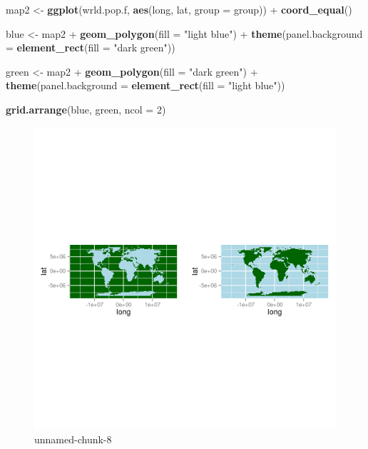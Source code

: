\documentclass[]{article}
\makeatletter
\newenvironment{Shaded}{}{}
\newcommand{\KeywordTok}[1]{\textcolor[rgb]{0.00,0.44,0.13}{\textbf{{#1}}}}
\newcommand{\DataTypeTok}[1]{\textcolor[rgb]{0.56,0.13,0.00}{{#1}}}
\newcommand{\DecValTok}[1]{\textcolor[rgb]{0.25,0.63,0.44}{{#1}}}
\newcommand{\StringTok}[1]{\textcolor[rgb]{0.25,0.44,0.63}{{#1}}}
\newcommand{\NormalTok}[1]{{#1}}
\def\maxwidth{\ifdim\Gin@nat@width>\linewidth\linewidth
\else\Gin@nat@width\fi}
\let\Oldincludegraphics\includegraphics
\renewcommand{\includegraphics}[1]{\Oldincludegraphics[width=\maxwidth]{#1}}
\makeatother
\begin{document}
\begin{Shaded}
\begin{Highlighting}[]
\NormalTok{map2 <-}\StringTok{ }\KeywordTok{ggplot}\NormalTok{(wrld.pop.f, }\KeywordTok{aes}\NormalTok{(long, lat, }\DataTypeTok{group =} \NormalTok{group)) +}\StringTok{ }\KeywordTok{coord_equal}\NormalTok{()}

\NormalTok{blue <-}\StringTok{ }\NormalTok{map2 +}\StringTok{ }\KeywordTok{geom_polygon}\NormalTok{(}\DataTypeTok{fill =} \StringTok{"light blue"}\NormalTok{) +}\StringTok{ }\KeywordTok{theme}\NormalTok{(}\DataTypeTok{panel.background =} \KeywordTok{element_rect}\NormalTok{(}\DataTypeTok{fill =} \StringTok{"dark green"}\NormalTok{))}

\NormalTok{green <-}\StringTok{ }\NormalTok{map2 +}\StringTok{ }\KeywordTok{geom_polygon}\NormalTok{(}\DataTypeTok{fill =} \StringTok{"dark green"}\NormalTok{) +}\StringTok{ }\KeywordTok{theme}\NormalTok{(}\DataTypeTok{panel.background =} \KeywordTok{element_rect}\NormalTok{(}\DataTypeTok{fill =} \StringTok{"light blue"}\NormalTok{))}

\KeywordTok{grid.arrange}\NormalTok{(blue, green, }\DataTypeTok{ncol =} \DecValTok{2}\NormalTok{)}
\end{Highlighting}
\end{Shaded}

\begin{figure}[htbp]
\centering
\includegraphics{figure/unnamed-chunk-8.png}
\caption{unnamed-chunk-8}
\end{figure}
\end{document}
